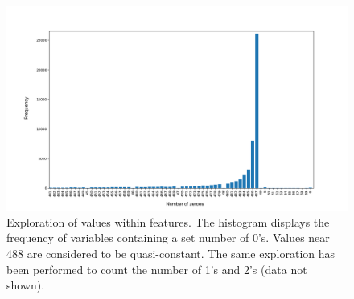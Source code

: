 \begin{figure}[!ht]
    \centering
    \includegraphics[width=0.75\linewidth]{Minor Thesis/figures/histo/Counter.png}
    \caption{Exploration of values within features. The histogram displays the frequency of variables containing a set number of 0's. Values near 488 are considered to be quasi-constant. The same exploration has been performed to count the number of 1's and 2's (data not shown).}
    \label{fig:counter}
\end{figure}